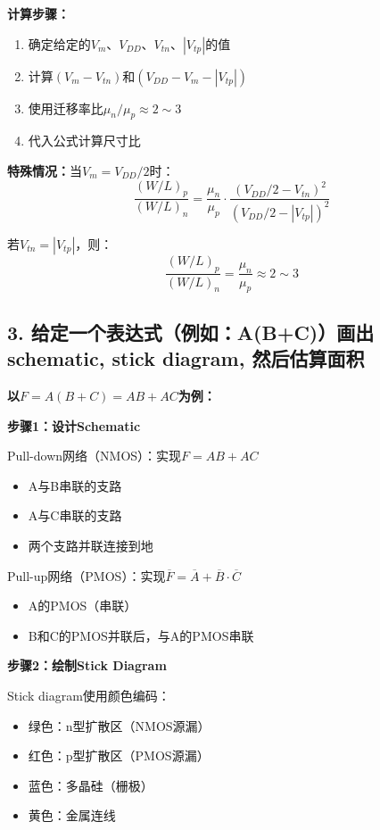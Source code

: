 \documentclass[UTF8,12pt,a4paper]{ctexart}
\begin{document}
\textbf{计算步骤：}
\begin{enumerate}
    \item 确定给定的$V_m$、$V_{DD}$、$V_{tn}$、$|V_{tp}|$的值
    \item 计算$(V_m - V_{tn})$和$(V_{DD} - V_m - |V_{tp}|)$
    \item 使用迁移率比$\mu_n/\mu_p \approx 2\sim3$
    \item 代入公式计算尺寸比
\end{enumerate}

\textbf{特殊情况：}当$V_m = V_{DD}/2$时：
\begin{equation}
\frac{(W/L)_p}{(W/L)_n} = \frac{\mu_n}{\mu_p} \cdot \frac{(V_{DD}/2 - V_{tn})^2}{(V_{DD}/2 - |V_{tp}|)^2}
\end{equation}

若$V_{tn} = |V_{tp}|$，则：
\begin{equation}
\frac{(W/L)_p}{(W/L)_n} = \frac{\mu_n}{\mu_p} \approx 2\sim3
\end{equation}

\subsection*{3. 给定一个表达式（例如：A(B+C)）画出schematic, stick diagram, 然后估算面积}

\textbf{以$F = A(B+C) = AB + AC$为例：}

\textbf{步骤1：设计Schematic}

Pull-down网络（NMOS）：实现$F = AB + AC$
\begin{itemize}
    \item A与B串联的支路
    \item A与C串联的支路
    \item 两个支路并联连接到地
\end{itemize}

Pull-up网络（PMOS）：实现$\overline{F} = \overline{A} + \overline{B}\cdot\overline{C}$
\begin{itemize}
    \item A的PMOS（串联）
    \item B和C的PMOS并联后，与A的PMOS串联
\end{itemize}

\textbf{步骤2：绘制Stick Diagram}

Stick diagram使用颜色编码：
\begin{itemize}
    \item 绿色：n型扩散区（NMOS源漏）
    \item 红色：p型扩散区（PMOS源漏）
    \item 蓝色：多晶硅（栅极）
    \item 黄色：金属连线
\end{itemize}
\end{document}

